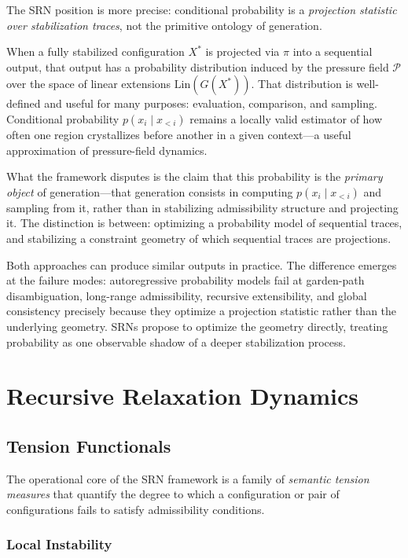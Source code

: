 \documentclass[11pt, a4paper]{article}
\theoremstyle{srn}
\theoremstyle{srnremark}
\begin{document}
The SRN position is more precise: conditional probability is a
\emph{projection statistic over stabilization traces}, not the
primitive ontology of generation.

When a fully stabilized configuration $X^*$ is projected via $\pi$
into a sequential output, that output has a probability distribution
induced by the pressure field $\mathcal{P}$ over the space of linear
extensions $\mathrm{Lin}(G(X^*))$.
That distribution is well-defined and useful for many purposes:
evaluation, comparison, and sampling.
Conditional probability $p(x_i \mid x_{<i})$ remains a
locally valid estimator of how often one region crystallizes before
another in a given context---a useful approximation of pressure-field
dynamics.

What the framework disputes is the claim that this probability is the
\emph{primary object} of generation---that generation consists in
computing $p(x_i \mid x_{<i})$ and sampling from it, rather than in
stabilizing admissibility structure and projecting it.
The distinction is between: optimizing a probability model of
sequential traces, and stabilizing a constraint geometry of which
sequential traces are projections.

Both approaches can produce similar outputs in practice.
The difference emerges at the failure modes: autoregressive
probability models fail at garden-path disambiguation, long-range
admissibility, recursive extensibility, and global consistency
precisely because they optimize a projection statistic rather than
the underlying geometry.
SRNs propose to optimize the geometry directly, treating probability
as one observable shadow of a deeper stabilization process.

\section{Recursive Relaxation Dynamics}
\label{sec:dynamics}

\subsection{Tension Functionals}

The operational core of the SRN framework is a family of
\emph{semantic tension measures} that quantify the degree to which a
configuration or pair of configurations fails to satisfy admissibility
conditions.

\subsubsection*{Local Instability}
\end{document}
